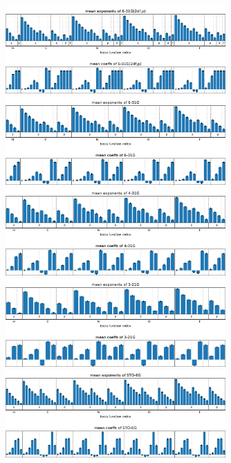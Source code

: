 \begin{figure}
    \centering
    \includegraphics[width=0.75\textwidth]{chapters/results/results_images/adaptive_basis_functions/mean_exps_and_coeffs6-31G(2df,p)}
    \includegraphics[width=0.75\textwidth]{chapters/results/results_images/adaptive_basis_functions/mean_exps_and_coeffs6-31G}
    \includegraphics[width=0.75\textwidth]{chapters/results/results_images/adaptive_basis_functions/mean_exps_and_coeffs4-31G}
    \includegraphics[width=0.75\textwidth]{chapters/results/results_images/adaptive_basis_functions/mean_exps_and_coeffs3-21G}
    \includegraphics[width=0.75\textwidth]{chapters/results/results_images/adaptive_basis_functions/mean_exps_and_coeffsSTO-6G}

\end{figure}
